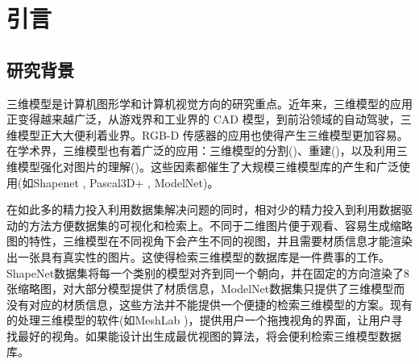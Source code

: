 \documentclass[UTF8,openany,AutoFakeBold,AutoFakeSlant,cs4size]{ctexbook}
\begin{document}
{
	\fancyhf{}
	\fancyfoot[CO,CE]{~\thepage~}
	\renewcommand{\headrulewidth}{0.7pt}
	\renewcommand{\footrulewidth}{0pt}
}
\fancyhf{}
\fancyfoot[CO,CE]{~\thepage~}
\renewcommand{\headrulewidth}{0.7pt}
\renewcommand{\footrulewidth}{0pt}
\renewcommand{\contentsname}{\centerline{全文目录}}
\tableofcontents
{}
\clearpage





\normalsize
\linespread{1.5}\selectfont
{
	\fancyhf{}
	\fancyhead[RE,RO]{\leftmark}
	\fancyfoot[CO,CE]{~\thepage~}
	\renewcommand{\headrulewidth}{0.7pt}
	\renewcommand{\footrulewidth}{0pt}
}
\fancyhf{}
\fancyhead[RE,RO]{\leftmark}
\fancyfoot[CO,CE]{~\thepage~}
\renewcommand{\headrulewidth}{0.7pt}
\renewcommand{\footrulewidth}{0pt}



\chapter{引言}

\section{研究背景}

三维模型是计算机图形学和计算机视觉方向的研究重点。近年来，三维模型的应用正变得越来越广泛，从游戏界和工业界的 CAD 模型，到前沿领域的自动驾驶，三维模型正大大便利着业界。RGB-D 传感器的应用也使得产生三维模型更加容易。在学术界，三维模型也有着广泛的应用：三维模型的分割(\cite{Chen2009ABF, Kundu2014JointSS})、重建(\cite{Choy20163DR2N2AU, Mandikal20183DLMNetLE})，以及利用三维模型强化对图片的理解(\cite{Choy2015EnrichingOD})。这些因素都催生了大规模三维模型库的产生和广泛使用(如Shapenet \cite{Chang2015ShapeNetAI}, Pascal3D+ \cite{Xiang2014BeyondPA}, ModelNet\cite{Wu20143DSA})。

在如此多的精力投入利用数据集解决问题的同时，相对少的精力投入到利用数据驱动的方法方便数据集的可视化和检索上。不同于二维图片便于观看、容易生成缩略图的特性，三维模型在不同视角下会产生不同的视图，并且需要材质信息才能渲染出一张具有真实性的图片。这使得检索三维模型的数据库是一件费事的工作。ShapeNet数据集\cite{Chang2015ShapeNetAI}将每一个类别的模型对齐到同一个朝向，并在固定的方向渲染了8张缩略图，对大部分模型提供了材质信息，ModelNet数据集\cite{Wu20143DSA}只提供了三维模型而没有对应的材质信息，这些方法并不能提供一个便捷的检索三维模型的方案。现有的处理三维模型的软件(如MeshLab \cite{Cignoni2008MeshLabAO})，提供用户一个拖拽视角的界面，让用户寻找最好的视角。如果能设计出生成最优视图的算法，将会便利检索三维模型数据库。
\end{document}
